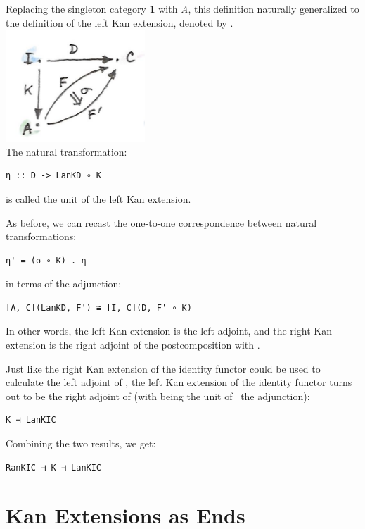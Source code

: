 Replacing the singleton category \textbf{1} with \emph{A}, this
definition naturally generalized to the definition of the left Kan
extension, denoted by .\\
\includegraphics[width=2.06250in]{images/kan12.jpg}\\
The natural transformation:

\begin{verbatim}
η :: D -> LanKD ∘ K
\end{verbatim}

is called the unit of the left Kan extension.

As before, we can recast the one-to-one correspondence between natural
transformations:

\begin{verbatim}
η' = (σ ∘ K) . η
\end{verbatim}

in terms of the adjunction:

\begin{verbatim}
[A, C](LanKD, F') ≅ [I, C](D, F' ∘ K)
\end{verbatim}

In other words, the left Kan extension is the left adjoint, and the
right Kan extension is the right adjoint of the postcomposition with
.

Just like the right Kan extension of the identity functor could be used
to calculate the left adjoint of , the left Kan extension of
the identity functor turns out to be the right adjoint of 
(with  being the unit of~ the adjunction):

\begin{verbatim}
K ⊣ LanKIC
\end{verbatim}

Combining the two results, we get:

\begin{verbatim}
RanKIC ⊣ K ⊣ LanKIC
\end{verbatim}

\section{Kan Extensions as Ends}\label{kan-extensions-as-ends}

